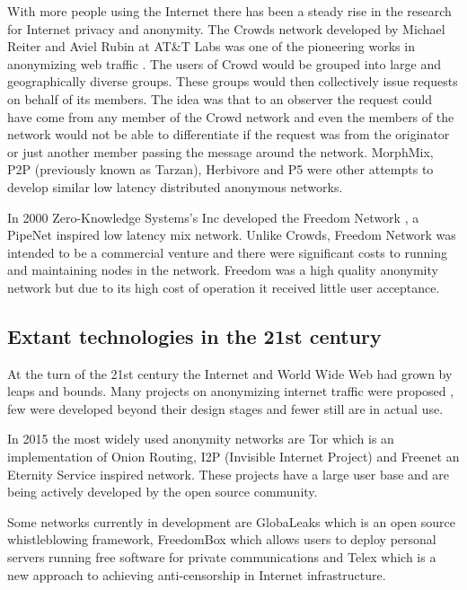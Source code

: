 \documentclass{llncs}
\begin{document}
With more people using the Internet there has been a steady rise in the research for Internet privacy and anonymity. The Crowds network developed by Michael Reiter and Aviel Rubin at AT\&T Labs was one of the pioneering works in anonymizing web traffic \cite{crowds:tissec}. The users of Crowd would be grouped into large and geographically diverse groups. These groups would then collectively issue requests on behalf of its members. The idea was that to an observer the request could have come from any member of the Crowd network and even the members of the network would not be able to differentiate if the request was from the originator or just another member passing the message around the network. MorphMix\cite{morphmix:wpes2002}, P2P (previously known as Tarzan)\cite{tarzan:ccs02}, Herbivore\cite{herbivore:tr} and P5\cite{sherwood-protocol} were other attempts to develop similar low latency distributed anonymous networks.

In 2000 Zero-Knowledge Systems's Inc developed the Freedom Network \cite{freedom2-arch}, a PipeNet inspired low latency mix network. Unlike Crowds, Freedom Network was intended to be a commercial venture and there were significant costs to running and maintaining nodes in the network. Freedom was a high quality anonymity network but due to its high cost of operation it received little user acceptance.

\subsection{Extant technologies in the 21st century} \label{new_proj}

At the turn of the 21st century the Internet and World Wide Web had grown by leaps and bounds. Many projects on anonymizing internet traffic were proposed \cite{goldberg97privacyenhancing} \cite{fiveyearslater}, few were developed beyond their design stages and fewer still are in actual use.

In 2015 the most widely used anonymity networks are Tor \cite{tor-design} which is an implementation of Onion Routing, I2P (Invisible Internet Project) \cite{jrandom2003,zantout2011} and Freenet \cite{freenet} an Eternity Service inspired network. These projects have a large user base and are being actively developed by the open source community.

Some networks currently in development are GlobaLeaks \cite{globaleaks} which is an open source whistleblowing framework, FreedomBox \cite{freedom-box} which allows users to deploy personal servers running free software for private communications and Telex \cite{telex11} which is a new approach to achieving anti-censorship in Internet infrastructure. 
\end{document}

